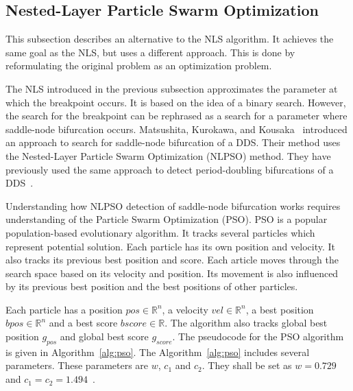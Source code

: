 \subsection{Nested-Layer Particle Swarm Optimization}
This subsection describes an alternative to the NLS algorithm.
It achieves the same goal as the NLS, but uses a different approach.
This is done by reformulating the original problem as an optimization problem.
\par
The NLS introduced in the previous subsection approximates the parameter at which the breakpoint occurs.
It is based on the idea of a binary search.
However, the search for the breakpoint can be rephrased as a search for a parameter where saddle-node bifurcation occurs.
Matsushita, Kurokawa, and Kousaka~\cite{Matsushita2019} introduced an approach to search for saddle-node bifurcation of a DDS.
Their method uses the Nested-Layer Particle Swarm Optimization (NLPSO) method.
They have previously used the same approach to detect period-doubling bifurcations of a DDS~\cite{Matsushita20170721}.
\par
Understanding how NLPSO detection of saddle-node bifurcation works requires understanding of the Particle Swarm Optimization (PSO).
PSO is a popular population-based evolutionary algorithm.
It tracks several particles which represent potential solution.
Each particle has its own position and velocity. It also tracks its previous best position and score.
Each article moves through the search space based on its velocity and position.
Its movement is also influenced by its previous best position and the best positions of other particles.~\cite{Matsushita2019}
\par
Each particle has a position $pos \in \mathbb{R}^{n}$, a velocity $vel \in \mathbb{R}^{n}$, a best position $bpos \in \mathbb{R}^{n}$ and a best score $bscore \in \mathbb{R}$.
The algorithm also tracks global best position $g_{pos}$ and global best score $g_{score}$.
The pseudocode for the PSO algorithm is given in Algorithm~\ref{alg:pso}.
The Algorithm~\ref{alg:pso} includes several parameters.
These parameters are $w$, $c_{1}$ and $c_{2}$.
They shall be set as $w=0.729$ and $c_{1}=c_{2}=1.494$~\cite{Matsushita2019}.

